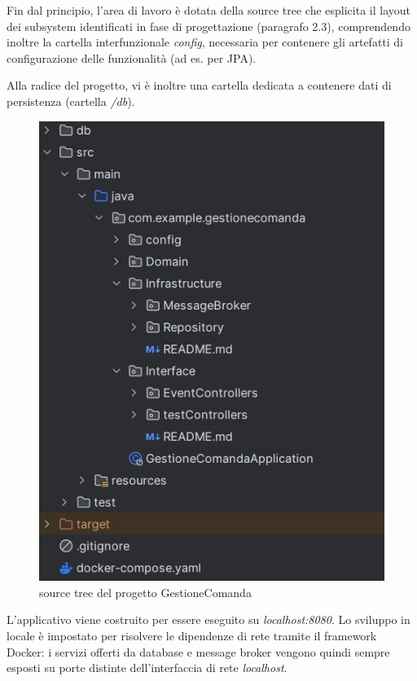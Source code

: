 Fin dal principio, l'area di lavoro è dotata della source tree che esplicita il layout dei subsystem identificati in fase di progettazione (paragrafo 2.3), comprendendo inoltre la cartella interfunzionale \textit{config}, necessaria per contenere gli artefatti di configurazione delle funzionalità (ad es. per JPA).

Alla radice del progetto, vi è inoltre una cartella dedicata a contenere dati di persistenza (cartella \textit{/db}).

\begin{figure}[htbp]
	\centering
	\includegraphics[scale=0.50]{iterazione1/images/source tree.jpg}
	\caption{source tree del progetto GestioneComanda
 \label{fig:srctreeGestioneComanda}}
\end{figure}

L'applicativo viene costruito per essere eseguito su \textit{localhost:8080}. Lo sviluppo in locale è impostato per risolvere le dipendenze di rete tramite il framework Docker: i servizi offerti da database e message broker vengono quindi sempre esposti su porte distinte dell'interfaccia di rete \textit{localhost}.
\clearpage